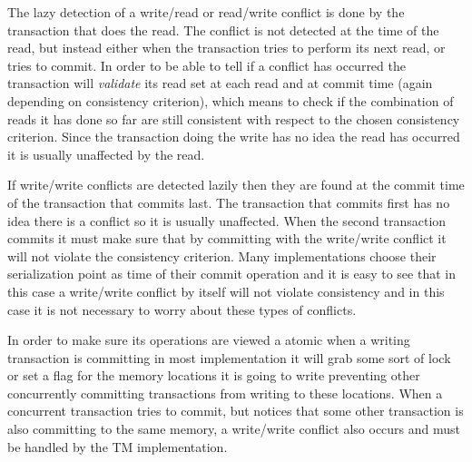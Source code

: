 The lazy detection of a write/read or read/write conflict is done by the transaction that does the read.
The conflict is not detected at the time of the read, but instead either
 when the transaction tries to perform its next read, or tries to commit.
In order to be able to tell if a conflict has occurred the transaction
 will \emph{validate} its read set at each read and at commit time 
(again depending on consistency criterion), which means to check 
if the combination of reads it has done so far are still consistent with
 respect to the chosen consistency criterion.
Since the transaction doing the write has no idea the read has occurred 
it is usually unaffected by the read.

If write/write conflicts are detected lazily then they are found at the 
commit time of the transaction that commits last.
The transaction that commits first has no idea there is a conflict so 
it is usually unaffected.
When the second transaction commits it must make sure that by committing 
with the write/write conflict it will not violate the consistency criterion.
Many implementations choose their serialization point as time of their 
commit operation and it is easy to see that in this case a write/write 
conflict by itself will not violate consistency and in this case it is not
 necessary to worry about these types of conflicts.

In order to make sure its operations are viewed a atomic when a writing transaction
 is committing in most implementation it will grab some sort of lock or set a flag
 for the memory locations it is going to write preventing other concurrently committing
 transactions from writing to these locations.
When a concurrent transaction tries to commit, but notices that some other
 transaction is also committing to the same memory, a write/write conflict 
also occurs and must be handled by the TM implementation.


